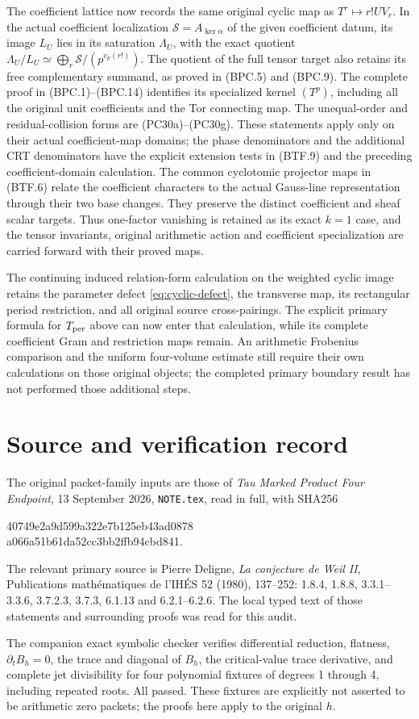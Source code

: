 The coefficient lattice now records the same original cyclic
map as \(T^r\mapsto r!UV_r\).  In the actual coefficient
localization \(\mathscr S=A_{\ker\alpha}\) of the given
coefficient datum, its image \(L_U\) lies in its saturation
\(\Lambda_U\), with the exact quotient
\(\Lambda_U/L_U\simeq
       \bigoplus_r\mathscr S/(p^{v_p(r!)})\).
The quotient of the full tensor target also retains its
free complementary summand, as proved in (BPC.5) and (BPC.9).
The complete proof in (BPC.1)--(BPC.14) identifies its
specialized kernel \((T^p)\), including all the original
unit coefficients and the Tor connecting map.  The
unequal-order and residual-collision forms are
(PC30a)--(PC30g).  These statements apply only on their
actual coefficient-map domains; the phase denominators and
the additional CRT denominators have the explicit extension
tests in (BTF.9) and the preceding coefficient-domain
calculation.  The common cyclotomic projector maps in
(BTF.6) relate the coefficient characters to the actual
Gauss-line representation through their two base changes.
They preserve the distinct coefficient and sheaf scalar
targets.  Thus one-factor vanishing is retained as its exact
\(k=1\) case, and the tensor invariants, original arithmetic
action and coefficient specialization are carried forward
with their proved maps.


The continuing induced relation-form calculation on the weighted
cyclic image retains the parameter defect
\eqref{eq:cyclic-defect}, the transverse map, its rectangular period
restriction, and all original source cross-pairings.  The explicit
primary formula for \(T_{\rm per}\) above can now enter that
calculation, while its complete coefficient Gram and restriction
maps remain.  An arithmetic Frobenius comparison and the uniform
four-volume estimate still require their own calculations on those
original objects; the completed primary boundary result has not
performed those additional steps.


\section*{Source and verification record}
The original packet-family inputs are those of
\emph{Tau Marked Product Four Endpoint}, 13 September 2026,
\texttt{NOTE.tex}, read in full, with SHA256
\begin{center}\ttfamily\small
40749e2a9d599a322e7b125eb43ad0878\\
a066a51b61da52cc3bb2ffb94cbd841.
\end{center}
The relevant primary source is Pierre Deligne,
\emph{La conjecture de Weil II}, Publications math\'ematiques de
l'IH\'ES 52 (1980), 137--252: 1.8.4, 1.8.8, 3.3.1--3.3.6,
3.7.2.3, 3.7.3, 6.1.13 and 6.2.1--6.2.6.  The local typed text of
those statements and surrounding proofs was read for this audit.

The companion exact symbolic checker verifies differential reduction,
flatness, $\partial_tB_h=0$, the trace and diagonal of $B_h$, the
critical-value trace derivative, and complete jet divisibility for four
polynomial fixtures of degrees 1 through 4, including repeated roots.
All passed.  These fixtures are explicitly not asserted to be
arithmetic zero packets; the proofs here apply to the original $h$.

\endgroup
